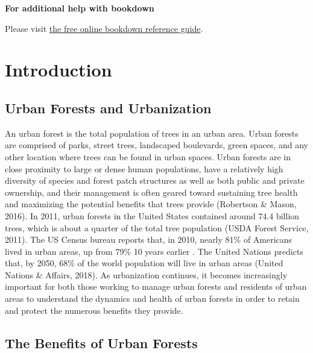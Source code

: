 \documentclass[12pt,twoside]{reedthesis}
\begin{document}
\textbf{For additional help with bookdown}

Please visit \href{https://bookdown.org/yihui/bookdown/}{the free online bookdown reference guide}.

\hypertarget{intro}{%
\chapter{Introduction}\label{intro}}

\hypertarget{urban-forests-and-urbanization}{%
\section{Urban Forests and Urbanization}\label{urban-forests-and-urbanization}}

An urban forest is the total population of trees in an urban area. Urban forests are comprised of parks, street trees, landscaped boulevards, green spaces, and any other location where trees can be found in urban spaces. Urban forests are in close proximity to large or dense human populations, have a relatively high diversity of species and forest patch structures as well as both public and private ownership, and their management is often geared toward sustaining tree health and maximizing the potential benefits that trees provide (Robertson \& Mason, 2016). In 2011, urban forests in the United States contained around 74.4 billion trees, which is about a quarter of the total tree population (USDA Forest Service, 2011). The US Census bureau reports that, in 2010, nearly 81\% of Americans lived in urban areas, up from 79\% 10 years earlier . The United Nations predicts that, by 2050, 68\% of the world population will live in urban areas (United Nations \& Affairs, 2018). As urbanization continues, it becomes increasingly important for both those working to manage urban forests and residents of urban areas to understand the dynamics and health of urban forests in order to retain and protect the numerous benefits they provide.

\hypertarget{the-benefits-of-urban-forests}{%
\section{The Benefits of Urban Forests}\label{the-benefits-of-urban-forests}}
\end{document}
